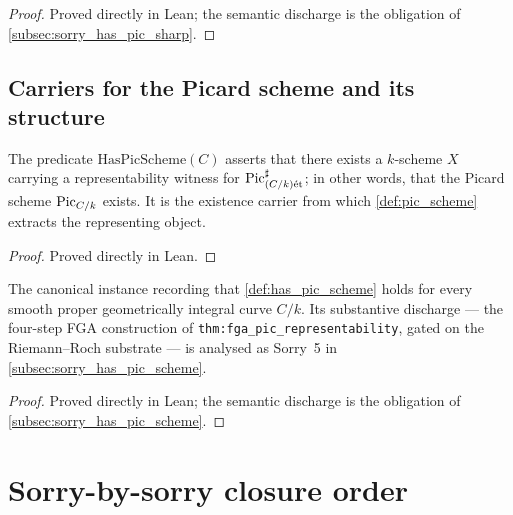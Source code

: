\begin{proof}

\leanok
  Proved directly in Lean; the semantic discharge is the obligation of
  \cref{subsec:sorry_has_pic_sharp}.
\end{proof}


\subsection{Carriers for the Picard scheme and its structure}
\label{subsec:fga_pic_scheme_carriers}

\begin{definition}
  \label{def:has_pic_scheme}
  The predicate \(\mathrm{HasPicScheme}(C)\) asserts that there exists a \(k\)-scheme
  \(X\) carrying a representability witness for \(\operatorname{Pic}^\sharp_{(C/k)\mathrm{\acute{e}t}}\); in
  other words, that the Picard scheme \(\operatorname{Pic}_{C/k}\) exists. It is the
  existence carrier from which \cref{def:pic_scheme} extracts the representing
  object.
\end{definition}

\begin{proof}
  Proved directly in Lean.
\end{proof}

\begin{definition}
  \label{def:inst_has_pic_scheme}
  The canonical instance recording that \cref{def:has_pic_scheme} holds for
  every smooth proper geometrically integral curve \(C/k\). Its substantive
  discharge --- the four-step FGA construction of
  \texttt{thm:fga_pic_representability}, gated on the Riemann--Roch substrate ---
  is analysed as Sorry~5 in \cref{subsec:sorry_has_pic_scheme}.
\end{definition}

\begin{proof}

\leanok
  Proved directly in Lean; the semantic discharge is the obligation of
  \cref{subsec:sorry_has_pic_scheme}.
\end{proof}


\section{Sorry-by-sorry closure order}
\label{sec:fga_pic_sorry_closure_order}

